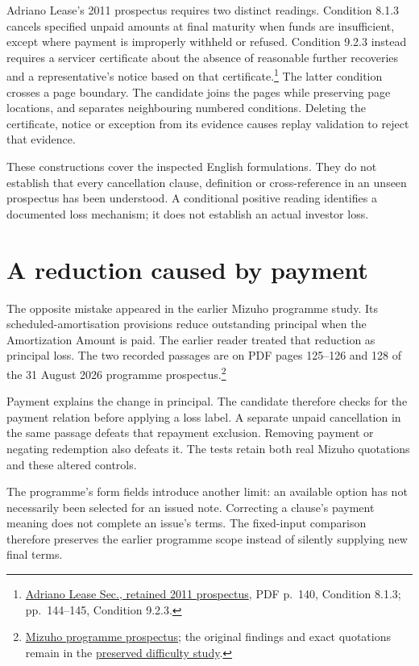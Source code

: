 \documentclass[11pt,a4paper]{article}
\begin{document}
Adriano Lease's 2011 prospectus requires two distinct readings. Condition 8.1.3
cancels specified unpaid amounts at final maturity when funds are insufficient,
except where payment is improperly withheld or refused. Condition 9.2.3 instead
requires a servicer certificate about the absence of reasonable further
recoveries and a representative's notice based on that certificate.\footnote{\href{../../prospectus/corner-cases-2026-10-04/sources/jur-more-hypo-1314069/source.pdf}{Adriano Lease Sec., retained 2011 prospectus}, PDF p.~140, Condition 8.1.3; pp.~144--145, Condition 9.2.3.}
The latter condition crosses a page boundary. The candidate joins the pages
while preserving page locations, and separates neighbouring numbered conditions.
Deleting the certificate, notice or exception from its evidence causes replay
validation to reject that evidence.

These constructions cover the inspected English formulations. They do not
establish that every cancellation clause, definition or cross-reference in an
unseen prospectus has been understood. A conditional positive reading identifies
a documented loss mechanism; it does not establish an actual investor loss.

\section*{A reduction caused by payment}

The opposite mistake appeared in the earlier Mizuho programme study. Its
scheduled-amortisation provisions reduce outstanding principal when the
Amortization Amount is paid. The earlier reader treated that reduction as
principal loss. The two recorded passages are on PDF pages 125--126 and 128
of the 31 August 2026 programme prospectus.\footnote{\href{../../prospectus/difficulty-2026-10-04/pdfs/case-105635287.pdf}{Mizuho programme prospectus}; the original findings and exact quotations remain in the \href{../prospectus-difficulty-2026-10-04/REPORT.md}{preserved difficulty study}.}

Payment explains the change in principal. The candidate therefore checks for
the payment relation before applying a loss label. A separate unpaid
cancellation in the same passage defeats that repayment exclusion. Removing
payment or negating redemption also defeats it. The tests retain both real
Mizuho quotations and these altered controls.

The programme's form fields introduce another limit: an available option has
not necessarily been selected for an issued note. Correcting a clause's
payment meaning does not complete an issue's terms. The fixed-input comparison
therefore preserves the earlier programme scope instead of silently supplying
new final terms.
\end{document}
